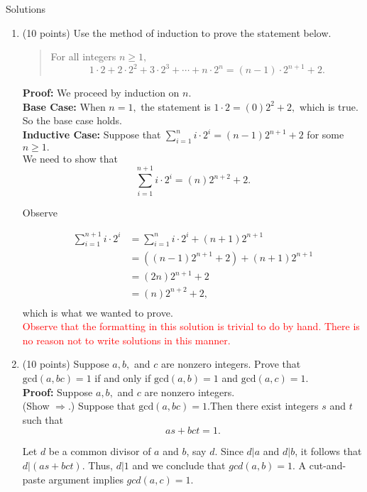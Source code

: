 \documentclass[12pt]{article}
\begin{document}
Solutions\\
\begin{enumerate}
\item (10 points) Use the method of induction to prove the statement below.\\
\begin{quote} For all integers $n\geq 1,$ $$1\cdot 2 +2 \cdot 2^2 +3 \cdot 2^3 + \cdots + n \cdot 2^n=(n-1) \cdot 2^{n+1}+2.$$ \end{quote}

\textbf{Proof:} We proceed by induction on $n.$\\

\textbf{Base Case:} When $n=1,$ the statement is $1\cdot 2=(0)2^2+2,$ which is true. So the base case holds.\\

\textbf{Inductive Case:} Suppose that $\sum_{i=1}^n i \cdot 2^i=(n-1)2^{n+1}+2$ for some $n\geq 1.$ \\

We need to show that 
$$\sum_{i=1}^{n+1} i \cdot 2^i=(n)2^{n+2}+2.$$ 

Observe

\begin{align*}
\sum_{i=1}^{n+1} i \cdot 2^i &=\sum_{i=1}^{n} i \cdot 2^i+(n+1)2^{n+1} \tag*{} \\
&= ((n-1)2^{n+1}+2)+(n+1)2^{n+1} \tag*{by the Ind. Hyp.} \\
&=(2n)2^{n+1} +2 \tag*{collecting like terms} \\
&=(n)2^{n+2}+2, \\
\end{align*}
which is what we wanted to prove.\\

\textcolor{red}{Observe that the formatting in this solution is trivial to do by hand. There is no reason not to write solutions in this manner.}

\vfill
\newpage
\item (10 points) Suppose $a,b,$ and $c$ are nonzero integers. Prove that $\text{gcd}(a,bc)=1$ if and only if $\text{gcd}(a,b)=1$ and $\text{gcd}(a,c )=1.$\\

\textbf{Proof:} Suppose $a,b,$ and $c$ are nonzero integers.\\
(Show $\Longrightarrow$.) Suppose that $\text{gcd}(a,bc)=1. $Then there exist integers $s$ and $t$ such that $$as+bct=1.$$

Let $d$ be a common divisor of $a$ and $b$, say $d.$ Since $d|a$ and $d|b$, it follows that $d|(as+bct).$ Thus, $d|1$ and we conclude that $gcd(a,b)=1.$ A cut-and-paste argument implies $gcd(a,c)=1.$\\


\end{enumerate}
\end{document}
